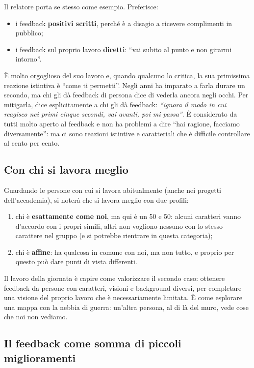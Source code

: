 Il relatore porta se stesso come esempio. Preferisce:
\begin{itemize}
  \item i feedback \textbf{positivi scritti}, perché è a disagio a ricevere
        complimenti in pubblico;
  \item i feedback sul proprio lavoro \textbf{diretti}: ``vai subito al
        punto e non girarmi intorno''.
\end{itemize}
È molto orgoglioso del suo lavoro e, quando qualcuno lo critica, la sua
primissima reazione istintiva è ``come ti permetti''. Negli anni ha imparato
a farla durare un secondo, ma chi gli dà feedback di persona dice di
vederla ancora negli occhi. Per mitigarla, dice esplicitamente a chi gli dà
feedback: \emph{``ignora il modo in cui reagisco nei primi cinque secondi,
vai avanti, poi mi passa''}. È considerato da tutti molto aperto al feedback
e non ha problemi a dire ``hai ragione, facciamo diversamente'': ma ci sono
reazioni istintive e caratteriali che è difficile controllare al cento per
cento.

\subsection{Con chi si lavora meglio}

Guardando le persone con cui si lavora abitualmente (anche nei progetti
dell'accademia), si noterà che si lavora meglio con due profili:
\begin{enumerate}
  \item chi è \textbf{esattamente come noi}, ma qui è un 50 e 50: alcuni
        caratteri vanno d'accordo con i propri simili, altri non vogliono
        nessuno con lo stesso carattere nel gruppo (e si potrebbe rientrare
        in questa categoria);
  \item chi è \textbf{affine}: ha qualcosa in comune con noi, ma non tutto,
        e proprio per questo può dare punti di vista differenti.
\end{enumerate}
Il lavoro della giornata è capire come valorizzare il secondo caso: ottenere
feedback da persone con caratteri, visioni e background diversi, per
completare una visione del proprio lavoro che è necessariamente limitata. È
come esplorare una mappa con la nebbia di guerra: un'altra persona, al di là
del muro, vede cose che noi non vediamo.

\subsection{Il feedback come somma di piccoli miglioramenti}

